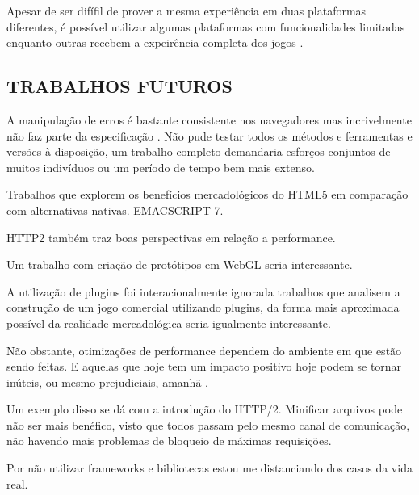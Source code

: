 \begin{draft}
Apesar de ser difífil de prover a mesma experiência em duas plataformas diferentes, é possível utilizar algumas plataformas com funcionalidades limitadas enquanto outras recebem a expeirência completa dos jogos \autocite[pp. 1]{currentStateCrossPlatform}.

\subsection{TRABALHOS FUTUROS}
A manipulação de erros é bastante consistente nos navegadores mas 
incrivelmente não faz parte da especificação \autocite{howBrowsersWork}.
Não pude testar todos os métodos e ferramentas e versões à
disposição, um trabalho completo demandaria esforços conjuntos de
muitos indivíduos ou um período de tempo bem mais extenso. 

Trabalhos que explorem os benefícios mercadológicos do HTML5 em comparação com alternativas nativas.
EMACSCRIPT 7.

HTTP2 também traz boas perspectivas em relação a performance.

Um trabalho com criação de protótipos em WebGL seria interessante.

A utilização de plugins foi interacionalmente ignorada trabalhos
que analisem a construção de um jogo comercial utilizando plugins,
da forma mais aproximada possível da realidade mercadológica seria
igualmente interessante.

Não obstante, otimizações de performance dependem do ambiente em
que estão sendo feitas. E aquelas que hoje tem um impacto positivo
hoje podem se tornar inúteis, ou mesmo prejudiciais, amanhã
\autocite[pp.131]{html5mostwanted}.

Um exemplo disso se dá com a introdução do HTTP/2. Minificar arquivos
pode não ser mais benéfico, visto que todos passam pelo mesmo canal
de comunicação, não havendo mais problemas de bloqueio de máximas
requisições.

Por não utilizar frameworks e bibliotecas estou me distanciando
dos casos da vida real.


\end{draft}
